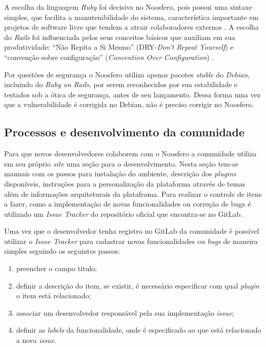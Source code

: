 A escolha da linguagem \textit{Ruby} foi decisiva no Noosfero, pois possui uma sintaxe simples, que facilita a manutenibilidade do sistema, característica importante em projetos de software livre que tendem a atrair colaboradores externos \cite{meirelles2013}. A escolha do \textit{Rails} foi influenciada pelos seus conceitos básicos que auxiliam em sua produtividade: ``Não Repita a Si Mesmo'' (DRY-\textit{Don't Repeat Yourself}) e ``convenção sobre configuração'' (\textit{Convention Over Configuration}) \cite{akita2006repensando}.

Por questões de segurança o Noosfero utiliza apenas pacotes \textit{stable} do \textit{Debian}, incluindo do \textit{Ruby on Rails}, por serem reconhecidos por sua estabilidade e testados sob a ótica de segurança, antes de seu lançamento. Dessa forma uma vez que a vulnerabilidade é corrigida no Debian, não é preciso corrigir no Noosfero.

\subsection{Processos e desenvolvimento da comunidade}
\label{proc-desenvol-comunidade}

Para que novos desenvolvedores colaborem com o Noosfero a comunidade utiliza em seu próprio \textit{site} uma seção para o desenvolvimento. Nesta seção tem-se manuais com os passos para instalação do ambiente, descrição dos \textit{plugins} disponíveis, instruções para a personalização da plataforma através de temas além de informações arquiteturais da platafroma. Para realizar o controle de itens a fazer, como a implementação de novas funcionalidades ou correção de bugs é utilizado um \textit{Issue Tracker} do repositório oficial que encontra-se no GitLab.

Uma vez que o desenvolvedor tenha registro no GitLab da comunidade é possível utilizar o \textit{Issue Tracker} para cadastrar novas funcionalidades ou \textit{bugs} de maneira simples seguindo os seguintes passos:

\begin{enumerate}
\item preencher o campo título;
\item definir a descrição do item, se existir, é necessário especificar com qual \textit{plugin} o item está relacionado;
\item associar um desenvolvedor responsável pela sua implementação \textit{issue};
\item definir as \textit{labels} da funcionalidade, onde é especificado ao que está relacionado a nova \textit{issue}.
\end{enumerate}

